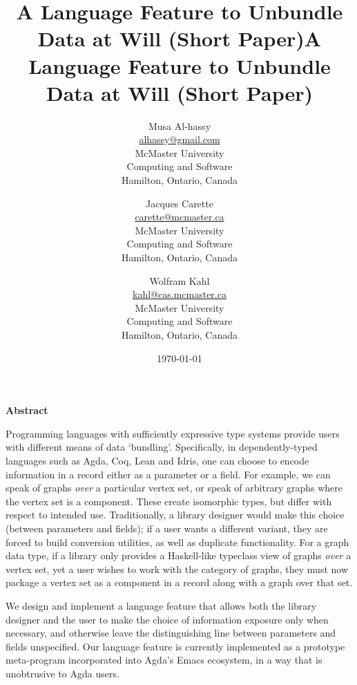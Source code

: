 \documentclass[sigplan,screen]{acmart}
\date{\today}
\title{A Language Feature to Unbundle Data at Will (Short Paper)}
\begin{document}
\title{A Language Feature to Unbundle Data at Will (Short Paper)}

\author{Musa Al-hassy \\ {\small \url{alhassy@gmail.com} \\ McMaster University \\ Computing and Software \\ Hamilton, Ontario, Canada}}
\author{Jacques Carette \\ {\small \url{carette@mcmaster.ca} \\ McMaster University \\ Computing and Software \\ Hamilton, Ontario, Canada}}
\author{Wolfram Kahl \\ {\small \url{kahl@cas.mcmaster.ca} \\ McMaster University \\ Computing and Software \\ Hamilton, Ontario, Canada}}

\maketitle


\begin{center}
\textbf{Abstract}
\end{center}
\begin{small}


Programming languages with sufficiently expressive type systems provide users with
different means of data ‘bundling’. Specifically, in dependently-typed languages such as
Agda, Coq, Lean and Idris, one can choose to encode information
in a record either as a parameter or a field.
For example, we can speak of graphs \emph{over} a particular vertex set, or speak
of arbitrary graphs where the vertex set is a component.
These create isomorphic types, but differ with respect to intended use.
Traditionally, a library designer would make this choice (between parameters and fields);
if a user wants a different variant, they are forced to build conversion utilities, as well as
duplicate functionality. For a graph data type,
if a library only provides a Haskell-like typeclass view of graphs \emph{over} a vertex set,
yet a user wishes to work with the category of graphs, they must now package a vertex
set as a component in a record along with a graph over that set.

We design and implement a language feature that allows both the library designer and
the user to make the choice of information exposure only when necessary, and otherwise leave
the distinguishing line between parameters and fields unspecified.
Our language feature is currently implemented as a prototype meta-program
incorporated into Agda's Emacs ecosystem, in a way that is unobtrusive to Agda users.
\end{small}
\end{document}
